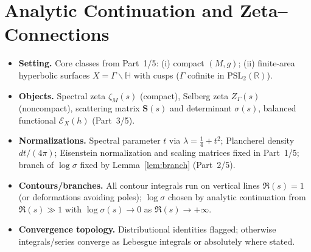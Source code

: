 

\section{Analytic Continuation and Zeta–Connections}
\label{sec:analytic-zeta}

\begin{tcolorbox}[colback=gray!5,colframe=gray!35,
  title=Scope \& Assumptions (ZNB-9+++ • MEA-Core-SS • enforced)]
\begin{itemize}
  \item \textbf{Setting.} Core classes from Part~1/5: (i) compact $(M,g)$; (ii) finite-area hyperbolic surfaces $X=\Gamma\backslash\mathbb H$ with cusps ($\Gamma$ cofinite in $\mathrm{PSL}_2(\mathbb R)$).
  \item \textbf{Objects.} Spectral zeta $\zeta_M(s)$ (compact), Selberg zeta $Z_\Gamma(s)$ (noncompact), scattering matrix $\mathbf S(s)$ and determinant $\sigma(s)$, balanced functional $\mathcal E_X(h)$ (Part~3/5).
  \item \textbf{Normalizations.} Spectral parameter $t$ via $\lambda=\tfrac14+t^2$; Plancherel density $dt/(4\pi)$; Eisenstein normalization and scaling matrices fixed in Part~1/5; branch of $\log\sigma$ fixed by Lemma~\ref{lem:branch} (Part~2/5).
  \item \textbf{Contours/branches.} All contour integrals run on vertical lines $\Re(s)=1$ (or deformations avoiding poles); $\log\sigma$ chosen by analytic continuation from $\Re(s)\gg1$ with $\log\sigma(s)\to 0$ as $\Re(s)\to+\infty$.
  \item \textbf{Convergence topology.} Distributional identities flagged; otherwise integrals/series converge as Lebesgue integrals or absolutely where stated.
\end{itemize}
\end{tcolorbox}

